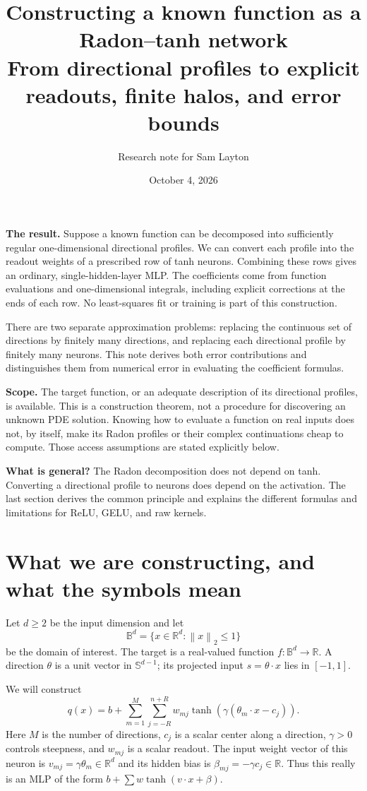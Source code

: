 \documentclass[11pt]{article}
\title{Constructing a known function as a Radon--tanh network\\
\large From directional profiles to explicit readouts, finite halos, and error bounds}
\author{Research note for Sam Layton}
\date{October 4, 2026}
\newcommand{\R}{\mathbb R}
\newcommand{\Sph}{\mathbb S^{d-1}}
\newcommand{\norm}[1]{\left\lVert#1\right\rVert}
\begin{document}
\maketitle

\textbf{The result.} Suppose a known function can be decomposed into sufficiently regular one-dimensional directional profiles. We can convert each profile into the readout weights of a prescribed row of tanh neurons. Combining these rows gives an ordinary, single-hidden-layer MLP. The coefficients come from function evaluations and one-dimensional integrals, including explicit corrections at the ends of each row. No least-squares fit or training is part of this construction.

There are two separate approximation problems: replacing the continuous set of directions by finitely many directions, and replacing each directional profile by finitely many neurons. This note derives both error contributions and distinguishes them from numerical error in evaluating the coefficient formulas.

\textbf{Scope.} The target function, or an adequate description of its directional profiles, is available. This is a construction theorem, not a procedure for discovering an unknown PDE solution. Knowing how to evaluate a function on real inputs does not, by itself, make its Radon profiles or their complex continuations cheap to compute. Those access assumptions are stated explicitly below.

\textbf{What is general?} The Radon decomposition does not depend on tanh. Converting a directional profile to neurons does depend on the activation. The last section derives the common principle and explains the different formulas and limitations for ReLU, GELU, and raw kernels.

\tableofcontents
\newpage

\section{What we are constructing, and what the symbols mean}

Let $d\ge2$ be the input dimension and let
\[
 \mathbb B^d=\{x\in\R^d:\norm{x}_2\le1\}
\]
be the domain of interest. The target is a real-valued function $f:\mathbb B^d\to\R$. A direction $\theta$ is a unit vector in $\Sph$; its projected input $s=\theta\cdot x$ lies in $[-1,1]$.

We will construct
\begin{equation}
 q(x)=b+\sum_{m=1}^{M}\sum_{j=-R}^{n+R}
 w_{mj}\tanh\!\left(\gamma(\theta_m\cdot x-c_j)\right).
 \label{eq:network}
\end{equation}
Here $M$ is the number of directions, $c_j$ is a scalar center along a direction, $\gamma>0$ controls steepness, and $w_{mj}$ is a scalar readout. The input weight vector of this neuron is $v_{mj}=\gamma\theta_m\in\R^d$ and its hidden bias is $\beta_{mj}=-\gamma c_j\in\R$. Thus this really is an MLP of the form $b+\sum w\tanh(v\cdot x+\beta)$.
\end{document}
